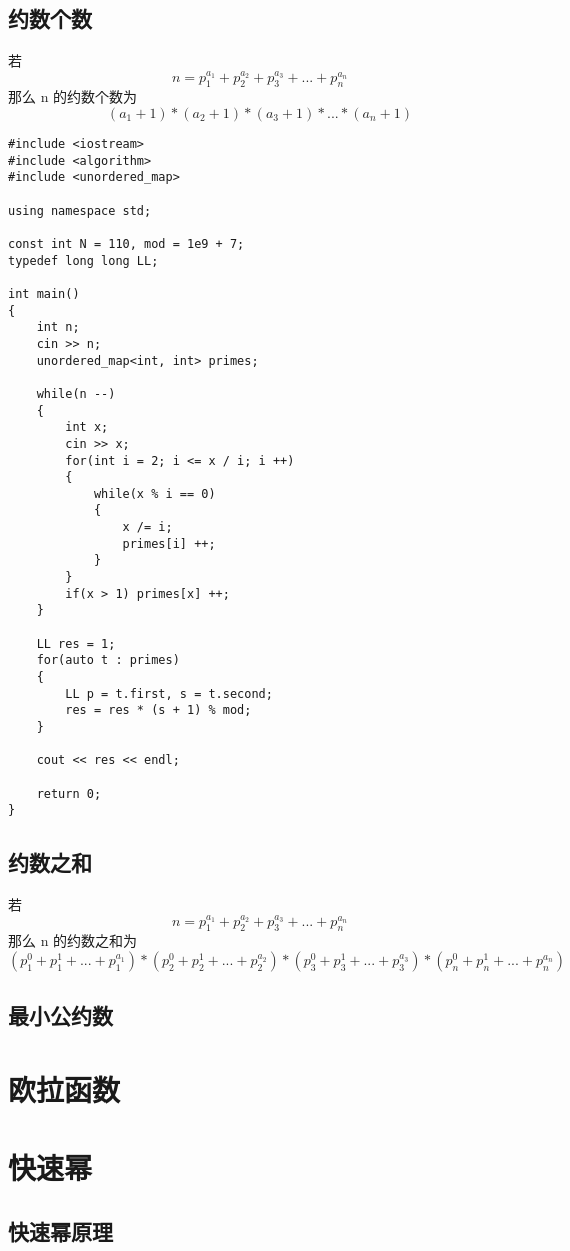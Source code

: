 \documentclass[]{book}
\begin{document}
\section{约数个数}
若 
$$n = p_{1}^{a_{1}} + p_{2}^{a_{2}} + p_{3}^{a_{3}} +...+ p_{n}^{a_{n}}$$
那么 n 的约数个数为
$$(a_{1} + 1) * (a_{2} + 1) * (a_{3} + 1) *...* (a_{n} + 1)$$
\begin{lstlisting}
#include <iostream>
#include <algorithm>
#include <unordered_map>

using namespace std;

const int N = 110, mod = 1e9 + 7;
typedef long long LL;

int main()
{
    int n;
    cin >> n;
    unordered_map<int, int> primes;
    
    while(n --)
    {
        int x;
        cin >> x;
        for(int i = 2; i <= x / i; i ++)
        {
            while(x % i == 0)
            {
                x /= i;
                primes[i] ++;
            }
        }
        if(x > 1) primes[x] ++;
    }
    
    LL res = 1;
    for(auto t : primes)
    {
        LL p = t.first, s = t.second;
        res = res * (s + 1) % mod;
    }
    
    cout << res << endl;
    
    return 0;
}
\end{lstlisting}
\section{约数之和}
若
$$n = p_{1}^{a_{1}} + p_{2}^{a_{2}} + p_{3}^{a_{3}} +...+ p_{n}^{a_{n}}$$
那么 n 的约数之和为
$$(p_{1}^{0} + p_{1}^{1} + ... + p_{1}^{a_{1}}) * (p_{2}^{0} + p_{2}^{1} + ... + p_{2}^{a_{2}}) * (p_{3}^{0} + p_{3}^{1} + ... + p_{3}^{a_{3}}) * (p_{n}^{0} + p_{n}^{1} + ... + p_{n}^{a_{n}})$$
\section{最小公约数}

\chapter{欧拉函数}

\chapter{快速幂}
\section{快速幂原理}
\end{document}

